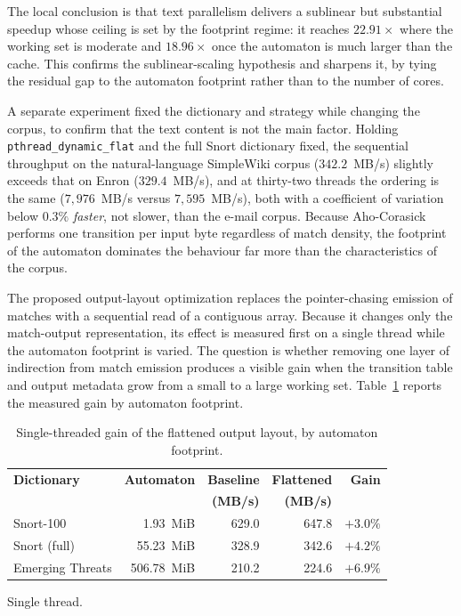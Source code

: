 The local conclusion is that text parallelism delivers a sublinear but substantial
speedup whose ceiling is set by the footprint regime: it reaches $22.91\times$
where the working set is moderate and $18.96\times$ once the automaton is much
larger than the cache. This confirms the sublinear-scaling hypothesis and sharpens
it, by tying the residual gap to the automaton footprint rather than to the number
of cores.

A separate experiment fixed the dictionary and strategy while changing the corpus,
to confirm that the text content is not the main factor. Holding
\texttt{pthread\_dynamic\_flat} and the full Snort dictionary fixed, the sequential
throughput on the natural-language SimpleWiki corpus ($342.2$~MB/s) slightly
exceeds that on Enron ($329.4$~MB/s), and at thirty-two threads the ordering is the
same ($7{,}976$~MB/s versus $7{,}595$~MB/s), both with a coefficient of variation
below $0.3\%$
\emph{faster}, not slower, than the e-mail corpus. Because Aho-Corasick performs
one transition per input byte regardless of match density, the footprint of the
automaton dominates the behaviour far more than the characteristics of the corpus.


The proposed output-layout optimization replaces the pointer-chasing emission of
matches with a sequential read of a contiguous array. Because it changes only the
match-output representation, its effect is measured first on a single thread while
the automaton footprint is varied. The question is whether removing one layer of
indirection from match emission produces a visible gain when the transition table
and output metadata grow from a small to a large working set. Table~\ref{tab:flat}
reports the measured gain by automaton footprint.

\begin{table}[H]
    \centering
    \caption{Single-threaded gain of the flattened output layout, by automaton
    footprint.}
    \label{tab:flat}
    \small
    \begin{tabular}{@{} l r r r r @{}}
        \toprule
        \textbf{Dictionary} & \textbf{Automaton} & \textbf{Baseline} & \textbf{Flattened} & \textbf{Gain} \\
         & & \textbf{(MB/s)} & \textbf{(MB/s)} & \\
        \midrule
        Snort-100        & 1.93~MiB   & 629.0 & 647.8 & $+3.0\%$ \\
        Snort (full)     & 55.23~MiB  & 328.9 & 342.6 & $+4.2\%$ \\
        Emerging Threats & 506.78~MiB & 210.2 & 224.6 & $+6.9\%$ \\
        \bottomrule
    \end{tabular}

    {\footnotesize\raggedright Single thread.\par}
\end{table}

